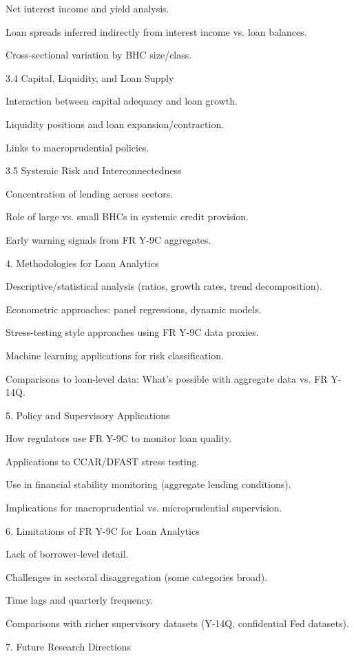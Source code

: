 \documentclass[conference]{IEEEtran}
\begin{document}
Net interest income and yield analysis.

Loan spreads inferred indirectly from interest income vs. loan balances.

Cross-sectional variation by BHC size/class.

3.4 Capital, Liquidity, and Loan Supply

Interaction between capital adequacy and loan growth.

Liquidity positions and loan expansion/contraction.

Links to macroprudential policies.

3.5 Systemic Risk and Interconnectedness

Concentration of lending across sectors.

Role of large vs. small BHCs in systemic credit provision.

Early warning signals from FR Y-9C aggregates.

4. Methodologies for Loan Analytics

Descriptive/statistical analysis (ratios, growth rates, trend decomposition).

Econometric approaches: panel regressions, dynamic models.

Stress-testing style approaches using FR Y-9C data proxies.

Machine learning applications for risk classification.

Comparisons to loan-level data: What’s possible with aggregate data vs. FR Y-14Q.

5. Policy and Supervisory Applications

How regulators use FR Y-9C to monitor loan quality.

Applications to CCAR/DFAST stress testing.

Use in financial stability monitoring (aggregate lending conditions).

Implications for macroprudential vs. microprudential supervision.

6. Limitations of FR Y-9C for Loan Analytics

Lack of borrower-level detail.

Challenges in sectoral disaggregation (some categories broad).

Time lags and quarterly frequency.

Comparisons with richer supervisory datasets (Y-14Q, confidential Fed datasets).

7. Future Research Directions
\end{document}
